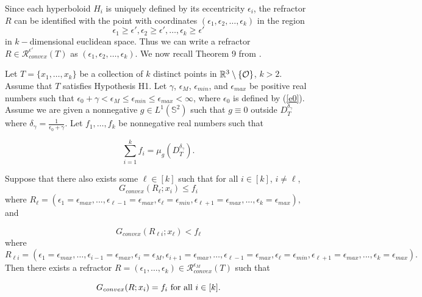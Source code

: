 \documentclass[review]{elsarticle}
\begin{document}
Since each hyperboloid $H_i$ is uniquely defined by its eccentricity $\epsilon_i$, the refractor $R$ can be identified with the point with coordinates $(\epsilon_1,\epsilon_2,\dots,\epsilon_k)$ in the region
\begin{equation}
    \epsilon_1\ge\epsilon',\epsilon_2\ge\epsilon',\dots,\epsilon_k\ge\epsilon'
\end{equation}
in $k-$dimensional euclidean space. Thus we can write a refractor $R\in \mathcal{R}_{convex}^{\epsilon'}(T)$ as $(\epsilon_1, \epsilon_2,\dots,\epsilon_k).$ We now recall Theorem 9 from \cite{KOT}.

\begin{theorem}\label{KOTthrm}
Let $T = \{x_1,\dots, x_k\}$ be a collection of $k$ distinct points in $\mathbb{R}^3\setminus \{\mathcal{O}\}$, $k > 2.$ Assume that $T$ satisfies Hypothesis H1. Let $\gamma$, $\epsilon_M$, $\epsilon_{min}$, and $\epsilon_{max}$ be positive real numbers such that $\epsilon_0 +\gamma <\epsilon_M \le \epsilon_{min} \le \epsilon_{max} < \infty$, where $\epsilon_0$ is defined by (\ref{e0}). Assume we are given a nonnegative $g\in L^1(\mathbb{S}^2)$ such that $g\equiv 0$ outside $D_T^{\delta_\gamma}$ where $\delta_\gamma=\frac1{\epsilon_0+\gamma}$. Let $f_1,\dots,f_k$ be nonnegative
real numbers such that

\begin{equation}
    \sum_{i=1}^k f_i = \mu_{g}(D_T^{\delta_\gamma}).
\end{equation}

Suppose that there also exists some $\ell \in [k]$ such that for all $i \in [k]$, $i \neq \ell$,
\begin{equation}
   G_{convex}(R_\ell; x_i) \le f_i
\end{equation}
where $R_\ell = (\epsilon_1 = \epsilon_{max},...,\epsilon_{\ell-1} = \epsilon_{max}, \epsilon_\ell = \epsilon_{min}, \epsilon_{\ell+1} = \epsilon_{max},...,\epsilon_k = \epsilon_{max}),$ and

\begin{equation}
   G_{convex}(R_{\ell i}; x_\ell) < f_\ell
\end{equation}
where $R_{\ell i} = (\epsilon_1 = \epsilon_{max},\dots,\epsilon_{i-1} = \epsilon_{max}, \epsilon_i = \epsilon_M , \epsilon_{i+1} = \epsilon_{max},\dots,\epsilon_{\ell-1} = \epsilon_{max}, \epsilon_\ell =
\epsilon_{min},\epsilon_{\ell+1} = \epsilon_{max},...,\epsilon_k = \epsilon_{max}).$ Then there exists a refractor $R = (\epsilon_1,\dots,\epsilon_k) \in \mathcal{R}_{convex}^{\epsilon_M} (T)$ such
that

\begin{equation}
G_{convex}(R; x_i) = f_i \textnormal{ for all } i \in[k].
\end{equation}
\end{theorem}
\end{document}
